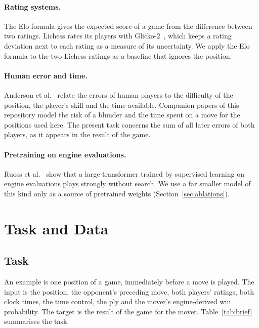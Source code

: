 \documentclass[11pt]{article}
\begin{document}
\paragraph{Rating systems.}
The Elo formula gives the expected score of a game from the difference
between two ratings. Lichess rates its players with
Glicko-2~\cite{glicko2}, which keeps a rating deviation next to each rating
as a measure of its uncertainty. We apply the Elo formula to the two Lichess
ratings as a baseline that ignores the position.

\paragraph{Human error and time.}
Anderson et al.~\cite{humanerror} relate the errors of human players to the
difficulty of the position, the player's skill and the time available.
Companion papers of this repository model the risk of a blunder and the time
spent on a move for the positions used here. The present task concerns the
sum of all later errors of both players, as it appears in the result of the
game.

\paragraph{Pretraining on engine evaluations.}
Ruoss et al.~\cite{searchless} show that a large transformer trained by
supervised learning on engine evaluations plays strongly without search. We
use a far smaller model of this kind only as a source of pretrained weights
(Section~\ref{sec:ablations}).

\section{Task and Data}
\label{sec:data}

\subsection{Task}

An example is one position of a game, immediately before a move is played.
The input is the position, the opponent's preceding move, both players'
ratings, both clock times, the time control, the ply and the mover's
engine-derived win probability. The target is the result of the game for the
mover. Table~\ref{tab:brief} summarises the task.
\end{document}
